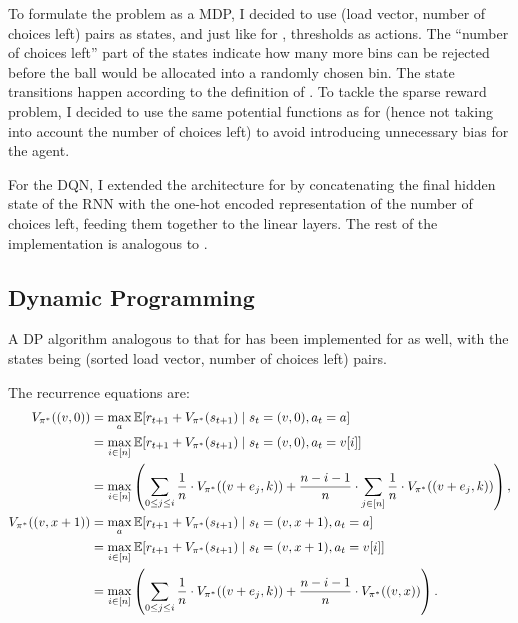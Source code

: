 To formulate the \KThinning problem as a MDP, I decided to use (load vector, number of choices left) pairs as states, and just like for \TwoThinning, thresholds as actions. The ``number of choices left'' part of the states indicate how many more bins can be rejected before the ball would be allocated into a randomly chosen bin. The state transitions happen according to the definition of \KThinning. To tackle the sparse reward problem, I decided to use the same potential functions as for \TwoThinning (hence not taking into account the number of choices left) to avoid introducing unnecessary bias for the agent.


For the DQN, I extended the architecture for \TwoThinning by concatenating the final hidden state of the RNN with the one-hot encoded representation of the number of choices left, feeding them together to the linear layers. The rest of the implementation is analogous to \TwoThinning.



\subsection{Dynamic Programming}


A DP algorithm analogous to that for \TwoThinning has been implemented for \KThinning as well, with the states being (sorted load vector, number of choices left) pairs.


The recurrence equations are:
\begin{align} 
    V_{\pi^*}((v, 0)) &= \max_a \mathbb{E} [r_{t+1} + V_{\pi^*}(s_{t+1}) \mid s_t=(v,0), a_t=a] \notag \\
    &= \max_{i \in [n]} \mathbb{E} [r_{t+1} + V_{\pi^*}(s_{t+1}) \mid s_t=(v,0), a_t=v[i]] \notag \\
    &= \max_{i \in [n]} \left(\sum_{0\leq j \leq i} \frac{1}{n}\cdot V_{\pi^*}((v+e_j,k)) + \frac{n-i-1}{n} \cdot  \sum_{j \in [n]} \frac{1}{n}\cdot V_{\pi^*}((v+e_j,k))\right), \label{eq:kthinning-dynamicprogramming} \\
    V_{\pi^*}((v, x+1)) &= \max_a \mathbb{E} [r_{t+1} + V_{\pi^*}(s_{t+1}) \mid s_t=(v,x+1), a_t=a] \notag \\
    &= \max_{i \in [n]} \mathbb{E} [r_{t+1} + V_{\pi^*}(s_{t+1}) \mid s_t=(v, x+1), a_t=v[i]] \notag \\
    &= \max_{i \in [n]} \left(\sum_{0\leq j \leq i} \frac{1}{n}\cdot V_{\pi^*}((v+e_j,k)) + \frac{n-i-1}{n} \cdot  V_{\pi^*}((v, x))\right).
\end{align}

